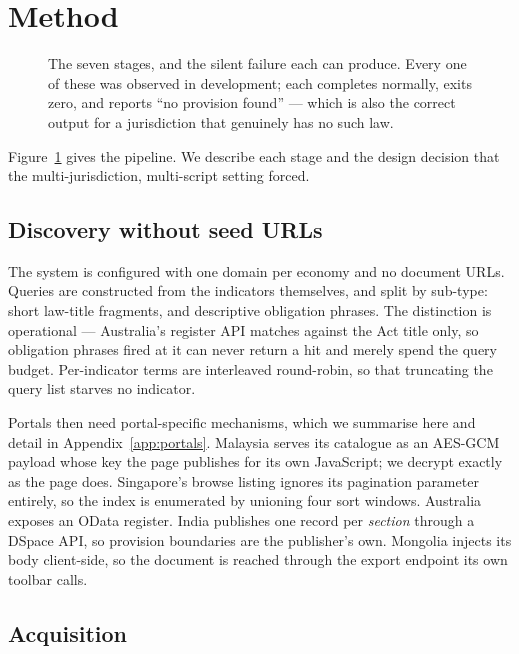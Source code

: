 \documentclass{article}
\begin{document}
\section{Method}
\label{sec:method}

\begin{figure}[t]
\centering
\resizebox{0.94\linewidth}{!}{}
\caption{The seven stages, and the silent failure each can produce. Every one of
these was observed in development; each completes normally, exits zero, and
reports ``no provision found'' --- which is also the correct output for a
jurisdiction that genuinely has no such law.}
\label{fig:pipeline}
\end{figure}

Figure~\ref{fig:pipeline} gives the pipeline. We describe each stage and the
design decision that the multi-jurisdiction, multi-script setting forced.

\subsection{Discovery without seed URLs}
\label{sec:discover}

The system is configured with one domain per economy and no document URLs.
Queries are constructed from the indicators themselves, and split by sub-type:
short law-title fragments, and descriptive obligation phrases. The distinction
is operational --- Australia's register API matches against the Act title only,
so obligation phrases fired at it can never return a hit and merely spend the
query budget. Per-indicator terms are interleaved round-robin, so that
truncating the query list starves no indicator.

Portals then need portal-specific mechanisms, which we summarise here and detail
in Appendix~\ref{app:portals}. Malaysia serves its catalogue as an AES-GCM
payload whose key the page publishes for its own JavaScript; we decrypt exactly
as the page does. Singapore's browse listing ignores its pagination parameter
entirely, so the index is enumerated by unioning four sort windows. Australia
exposes an OData register. India publishes one record per \emph{section} through
a DSpace API, so provision boundaries are the publisher's own. Mongolia injects
its body client-side, so the document is reached through the export endpoint its
own toolbar calls.

\subsection{Acquisition}
\label{sec:acquire}
\end{document}
